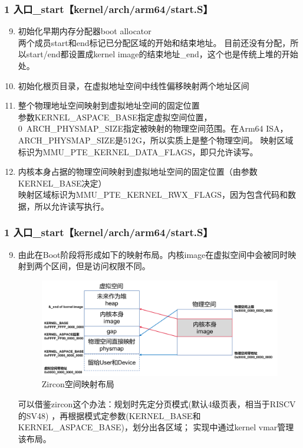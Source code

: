 \documentclass[
8pt, %
]{beamer}
\begin{document}
	\begin{frame}
		\frametitle{1 入口\_start【kernel/arch/arm64/start.S】}
		\begin{enumerate}\setcounter{enumi}{8}
			\item 初始化早期内存分配器boot allocator\\
			两个成员start和end标记已分配区域的开始和结束地址。
			目前还没有分配，所以start/end都设置成kernel image的结束地址\_end，这个也是传统上堆的开始处。
			\item 初始化根页目录，在虚拟地址空间中线性偏移映射两个地址区间
			\item 整个物理地址空间映射到虚拟地址空间的固定位置\\
			参数KERNEL\_ASPACE\_BASE指定虚拟空间位置，0~ARCH\_PHYSMAP\_SIZE指定被映射的物理空间范围。在Arm64 ISA，ARCH\_PHYSMAP\_SIZE是512G，所以实质上是整个物理空间。
			映射区域标识为MMU\_PTE\_KERNEL\_DATA\_FLAGS，即只允许读写。
			\item 内核本身占据的物理空间映射到虚拟地址空间的固定位置（由参数KERNEL\_BASE决定）\\
			映射区域标识为MMU\_PTE\_KERNEL\_RWX\_FLAGS，因为包含代码和数据，所以允许读写执行。
		\end{enumerate}
	\end{frame}

	\begin{frame}
		\frametitle{1 入口\_start【kernel/arch/arm64/start.S】}
		\begin{enumerate}\setcounter{enumi}{8}
			\item 由此在Boot阶段将形成如下的映射布局。内核image在虚拟空间中会被同时映射到两个区间，但是访问权限不同。
			\begin{figure}
				\includegraphics[width=0.6\linewidth]{zircon_aspace.png}
				\caption{Zircon空间映射布局}
			\end{figure}
		
			\begin{block}{}
				可以借鉴zircon这个办法：规划时先定分页模式(默认4级页表，相当于RISCV的SV48) ，再根据模式定参数(KERNEL\_BASE和KERNEL\_ASPACE\_BASE)，划分出各区域；
				实现中通过kernel vmar管理该布局。
			\end{block}
		\end{enumerate}
	\end{frame}
\end{document}

